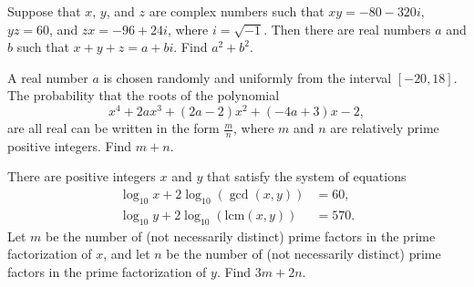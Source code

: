 \documentclass[11pt]{article}
\theoremstyle{definition}
\begin{document}
\begin{question}[name={2018 AIME II, \href{https://artofproblemsolving.com/community/c4p10083313}{Problem 5}}]
	Suppose that $x$, $y$, and $z$ are complex numbers such that $xy = -80-320i$, $yz =  60$, and $zx =  -96+24i$, where $i = \sqrt{-1}$. Then there are real numbers $a$ and $b$ such that $x+y+z = a+bi$. Find $a^2 + b^2$.	
\end{question}


%	












\begin{question}[name={2018 AIME II, \href{https://artofproblemsolving.com/community/c4p10083255}{Problem 6}}]
	A real number $a$ is chosen randomly and uniformly from the interval $[-20, 18]$. The probability that the roots of the polynomial\[x^4 + 2ax^3 + (2a-2)x^2 + (-4a+3)x - 2,\]are all real can be written in the form $\tfrac{m}{n}$, where $m$ and $n$ are relatively prime positive integers. Find $m+n$.
\end{question}


%	









\begin{question}[name={2019 AIME I, \href{https://artofproblemsolving.com/community/c4p11972709}{Problem 7}}]
	There are positive integers $x$ and $y$ that satisfy the system of equations
	\begin{align*}
		\log_{10} x + 2 \log_{10} (\gcd(x,y)) &= 60, \\ \log_{10} y + 2 \log_{10} (\text{lcm}(x,y)) &= 570.
	\end{align*}Let $m$ be the number of (not necessarily distinct) prime factors in the prime factorization of $x$, and let $n$ be the number of (not necessarily distinct) prime factors in the prime factorization of $y$. Find $3m+2n$.
\end{question}


%	
\end{document}
